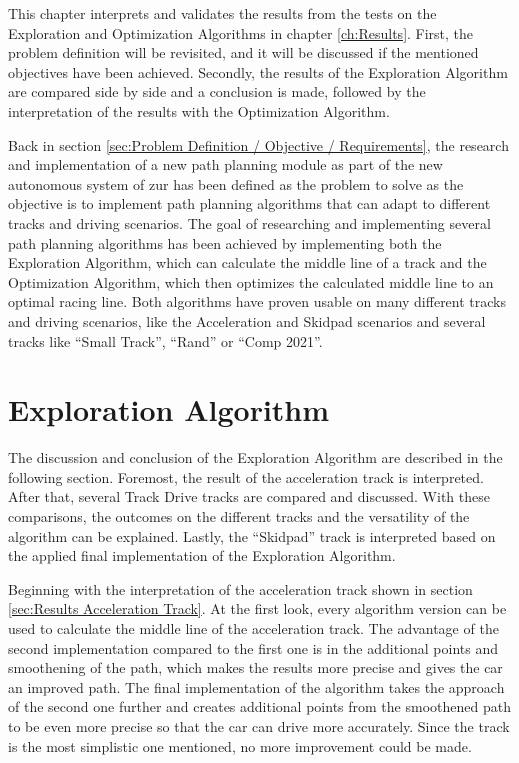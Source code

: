 This chapter interprets and validates the results from the tests on the Exploration and Optimization Algorithms in chapter \ref{ch:Results}. First, the problem definition will be revisited, and it will be discussed if the mentioned objectives have been achieved. Secondly, the results of the Exploration Algorithm are compared side by side and a conclusion is made, followed by the interpretation of the results with the Optimization Algorithm.

Back in section \ref{sec:Problem Definition / Objective / Requirements}, the research and implementation of a new path planning module as part of the new autonomous system of \acrlong{zur} has been defined as the problem to solve as the objective is to implement path planning algorithms that can adapt to different tracks and driving scenarios. The goal of researching and implementing several path planning algorithms has been achieved by implementing both the Exploration Algorithm, which can calculate the middle line of a track and the Optimization Algorithm, which then optimizes the calculated middle line to an optimal racing line. Both algorithms have proven usable on many different tracks and driving scenarios, like the Acceleration and Skidpad scenarios and several tracks like ``Small Track'', ``Rand'' or ``Comp 2021''.

\section{Exploration Algorithm}
The discussion and conclusion of the Exploration Algorithm are described in the following section. Foremost, the result of the acceleration track is interpreted. After that, several Track Drive tracks are compared and discussed. With these comparisons, the outcomes on the different tracks and the versatility of the algorithm can be explained. Lastly, the ``Skidpad'' track is interpreted based on the applied final implementation of the Exploration Algorithm.

Beginning with the interpretation of the acceleration track shown in section \ref{sec:Results Acceleration Track}. At the first look, every algorithm version can be used to calculate the middle line of the acceleration track. The advantage of the second implementation compared to the first one is in the additional points and smoothening of the path, which makes the results more precise and gives the car an improved path. The final implementation of the algorithm takes the approach of the second one further and creates additional points from the smoothened path to be even more precise so that the car can drive more accurately. Since the track is the most simplistic one mentioned, no more improvement could be made.

